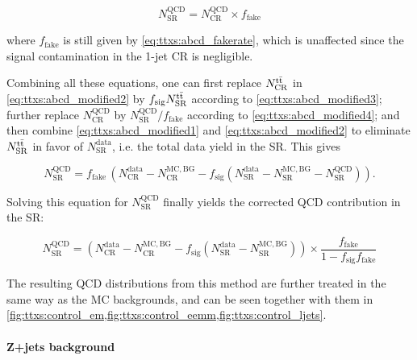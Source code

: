 \begin{equation}
\label{eq:ttxs:abcd_modified4}
    N^{\mathrm{QCD}}_{\mathrm{SR}} = N^{\mathrm{QCD}}_{\mathrm{CR}} \times f_{\mathrm{fake}}
\end{equation}

\noindent where $f_{\mathrm{fake}}$ is still given by \cref{eq:ttxs:abcd_fakerate}, which is unaffected since the \ttbar signal contamination in the 1-jet CR is negligible.

Combining all these equations, one can first replace $N^{\mathrm{t \bar{t}}}_{\mathrm{CR}}$ in \cref{eq:ttxs:abcd_modified2} by $f_{\mathrm{sig}} N^{\mathrm{t \bar{t}}}_{\mathrm{SR}}$ according to \cref{eq:ttxs:abcd_modified3}; further replace $N^{\mathrm{QCD}}_{\mathrm{CR}}$ by $N^{\mathrm{QCD}}_{\mathrm{SR}} / f_{\mathrm{fake}}$ according to \cref{eq:ttxs:abcd_modified4}; and then combine \cref{eq:ttxs:abcd_modified1} and \cref{eq:ttxs:abcd_modified2} to eliminate $N^{\mathrm{t \bar{t}}}_{\mathrm{SR}}$ in favor of $N^{\mathrm{data}}_{\mathrm{SR}}$, i.e. the total data yield in the SR. This gives

\begin{equation}
    N^{\mathrm{QCD}}_{\mathrm{SR}} = f_{\mathrm{fake}} \, \left( N^{\mathrm{data}}_{\mathrm{CR}} - N^{\mathrm{MC,BG}}_{\mathrm{CR}} - f_{\mathrm{sig}} \left( N^{\mathrm{data}}_{\mathrm{SR}} - N^{\mathrm{MC,BG}}_{\mathrm{SR}} - N^{\mathrm{QCD}}_{\mathrm{SR}} \right) \right) .
\end{equation}

Solving this equation for $N^{\mathrm{QCD}}_{\mathrm{SR}}$ finally yields the corrected QCD contribution in the SR:

\begin{equation}
\label{eq:ttxs:abcd_modified}
    N^{\mathrm{QCD}}_{\mathrm{SR}} = \left( N^{\mathrm{data}}_{\mathrm{CR}} - N^{\mathrm{MC,BG}}_{\mathrm{CR}} - f_{\mathrm{sig}} ( N^{\mathrm{data}}_{\mathrm{SR}} - N^{\mathrm{MC,BG}}_{\mathrm{SR}} )\right)
    \times \frac{ f_{\mathrm{fake}} } {1 - f_{\mathrm{sig}} f_{\mathrm{fake}}}
\end{equation}

The resulting QCD distributions from this method are further treated in the same way as the MC backgrounds, and can be seen together with them in \cref{fig:ttxs:control_em,fig:ttxs:control_eemm,fig:ttxs:control_ljets}.
  

\paragraph{Z+jets background}

